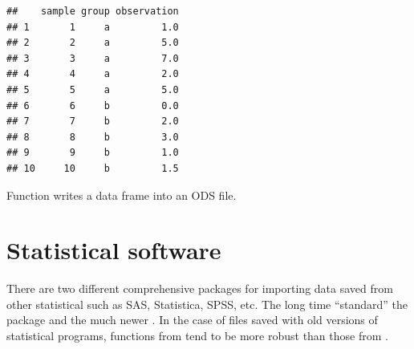 \documentclass[krantz2]{krantz}\usepackage{knitr}%
\begin{document}
\begin{knitrout}\footnotesize
{}\color{fgcolor}\begin{kframe}
\begin{alltt}
\hlstd{(}\hlstd{,}  \hlstd{=} \hlstd{)}
\end{alltt}


{\ttfamily\noindent\itshape\color{messagecolor}{\#\# Parsed with column specification:\\\#\# cols(\\\#\#\ \  sample = col\_double(),\\\#\#\ \  group = col\_character(),\\\#\#\ \  observation = col\_double()\\\#\# )}}\begin{verbatim}
##    sample group observation
## 1       1     a         1.0
## 2       2     a         5.0
## 3       3     a         7.0
## 4       4     a         2.0
## 5       5     a         5.0
## 6       6     b         0.0
## 7       7     b         2.0
## 8       8     b         3.0
## 9       9     b         1.0
## 10     10     b         1.5
\end{verbatim}
\end{kframe}
\end{knitrout}

Function  writes a data frame into an ODS file.

\section{Statistical software}\label{sec:files:stat}

There are two different comprehensive packages for importing data saved from other statistical such as SAS, Statistica, SPSS, etc. The long time ``standard'' the  package and the much newer . In the case of files saved with old versions of statistical programs, functions from  tend to be more robust than those from .

\subsection[foreign]{}
\end{document}
